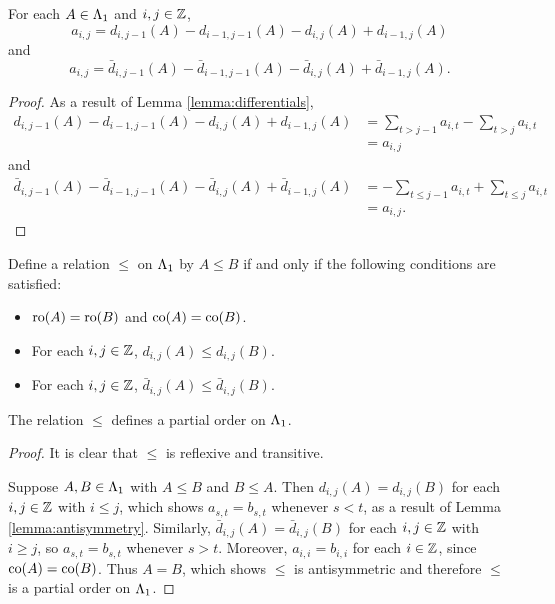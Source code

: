 \documentclass[a4paper, 11pt]{report}
\begin{document}
\begin{lemma}\label{lemma:antisymmetry}
For each $A\in\Lambda_1{}$ and $i,j\in\mathbb{Z}$,
\begin{equation*}
a_{i,j} = d_{i,j-1}{(A)} - d_{i-1,j-1}{(A)} - d_{i,j}{(A)} + d_{i-1,j}{(A)}
\end{equation*}
and
\begin{equation*}
a_{i,j} = \bar{d}_{i,j-1}{(A)} - \bar{d}_{i-1,j-1}{(A)} - \bar{d}_{i,j}{(A)} + \bar{d}_{i-1,j}{(A)}.
\end{equation*}
\end{lemma}

\begin{proof}
As a result of Lemma \ref{lemma:differentials},
\begin{align*}
d_{i,j-1}{(A)} - d_{i-1,j-1}{(A)} - d_{i,j}{(A)} + d_{i-1,j}{(A)} &= \sum_{t>j-1} a_{i,t} - \sum_{t>j} a_{i,t}\\
&= a_{i,j}
\end{align*}
and
\begin{align*}
\bar{d}_{i,j-1}{(A)} - \bar{d}_{i-1,j-1}{(A)} - \bar{d}_{i,j}{(A)} + \bar{d}_{i-1,j}{(A)} &= -\sum_{t\le j-1} a_{i,t} + \sum_{t\le j} a_{i,t}\\
&= a_{i,j}.
\end{align*}
\end{proof}

Define a relation $\le$ on $\Lambda_1{}$ by $A\le B$ if and only if the following conditions are satisfied:
\begin{itemize}
\item
$\operatorname{ro}(A)=\operatorname{ro}(B)$ and $\operatorname{co}(A)=\operatorname{co}(B)$.
\item
For each $i,j\in\mathbb{Z}$, $d_{i,j}{(A)}\le d_{i,j}{(B)}$.
\item
For each $i,j\in\mathbb{Z}$, $\bar{d}_{i,j}{(A)} \le \bar{d}_{i,j}{(B)}$.
\end{itemize}

\begin{lemma}\label{lemma:orbit-poset}
The relation $\le$ defines a partial order on $\Lambda_1{}$.
\end{lemma}

\begin{proof}
It is clear that $\le$ is reflexive and transitive.

Suppose $A,B\in\Lambda_1{}$ with $A\le B$ and $B\le A$. Then $d_{i,j}{(A)} = d_{i,j}{(B)}$ for each $i,j\in\mathbb{Z}$ with $i\le j$, which shows $a_{s,t}=b_{s,t}$ whenever $s<t$, as a result of Lemma \ref{lemma:antisymmetry}. Similarly, $\bar{d}_{i,j}{(A)} = \bar{d}_{i,j}{(B)}$ for each $i,j\in\mathbb{Z}$ with $i\geq j$, so $a_{s,t}=b_{s,t}$ whenever $s>t$. Moreover, $a_{i,i}=b_{i,i}$ for each $i\in\mathbb{Z}$, since $\operatorname{co}(A)=\operatorname{co}(B)$. Thus $A=B$, which shows $\le$ is antisymmetric and therefore $\le$ is a partial order on $\Lambda_1{}$.
\end{proof}
\end{document}
